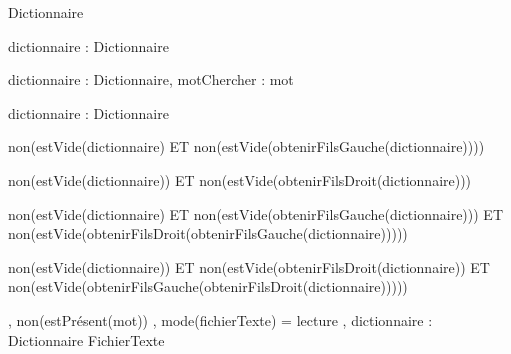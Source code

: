 \begin{algorithme}
		{}%
		{Dictionnaire}
	
		{dictionnaire : Dictionnaire}%
		{\booleen}
	
		{dictionnaire : Dictionnaire, motChercher : mot}%
		{\booleen}

		{dictionnaire : Dictionnaire}%
		{\entier}

		{}%
		{non(estVide(dictionnaire) ET non(estVide(obtenirFilsGauche(dictionnaire))))}

		{}%
		{non(estVide(dictionnaire)) ET non(estVide(obtenirFilsDroit(dictionnaire)))}

		{}
		{non(estVide(dictionnaire) ET non(estVide(obtenirFilsGauche(dictionnaire))) ET non(estVide(obtenirFilsDroit(obtenirFilsGauche(dictionnaire)))))}
	
		{}%
		{non(estVide(dictionnaire)) ET non(estVide(obtenirFilsDroit(dictionnaire)) ET non(estVide(obtenirFilsGauche(obtenirFilsDroit(dictionnaire)))))}

		{,}
		{non(estPrésent(mot))}
		{, }%
		{mode(fichierTexte) = lecture}
		{, }
		{dictionnaire : Dictionnaire}%
		{FichierTexte}
\end{algorithme}

